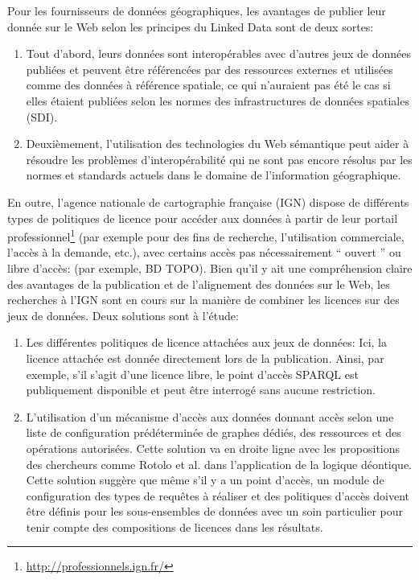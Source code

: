 \documentclass[a4paper,11pt,twoside]{report}
\begin{document}
Pour les fournisseurs de données géographiques, les avantages de publier leur donnée sur le Web selon les principes du Linked Data sont de deux sortes:

\begin{enumerate}
\item 
Tout d'abord, leurs données sont interopérables avec d'autres jeux de données publiées et peuvent être référencées par des ressources externes et utilisées comme des données à référence spatiale, ce qui n'auraient pas été le cas si elles étaient publiées selon les normes des infrastructures de données spatiales (SDI).


\item 
Deuxièmement, l'utilisation des technologies du Web sémantique peut aider à résoudre les problèmes d'interopérabilité qui ne sont pas encore résolus par les normes et standards actuels dans le domaine de l'information géographique.
 
\end{enumerate}
 

En outre, l'agence nationale de cartographie française (IGN) dispose de différents types de politiques de licence pour accéder aux données à partir de leur portail professionnel\footnote{\url{http://professionnels.ign.fr/}} (par exemple pour des fins de recherche, l'utilisation commerciale, l'accès à la demande, etc.), avec certains accès pas nécessairement `` ouvert '' ou libre d'accès: (par exemple, BD TOPO\circledR). Bien qu'il y ait une compréhension claire des avantages de la publication et de l'alignement des données sur le Web, les recherches à l'IGN sont en cours sur la manière de combiner les licences sur des jeux de données. Deux solutions sont à l'étude:


\begin{enumerate}

\item 
Les différentes politiques de licence attachées aux jeux de données: Ici, la licence attachée est donnée directement lors de la publication. Ainsi, par exemple, s'il s'agit d'une licence libre, le point d'accès SPARQL est publiquement disponible et peut être interrogé sans aucune restriction.

\item 
L'utilisation d'un mécanisme d'accès aux données donnant accès selon une liste de configuration prédéterminée de graphes dédiés, des ressources et des opérations autorisées. Cette solution va en droite ligne avec les propositions des chercheurs comme Rotolo et al. dans l'application de la logique déontique.  Cette solution suggère que même s'il y a un point d'accès, un module de configuration des types de requêtes à réaliser et des politiques d'accès doivent être définis pour les sous-ensembles de données avec un soin particulier pour tenir compte des compositions de licences dans les résultats.


\end{enumerate}
\end{document}
